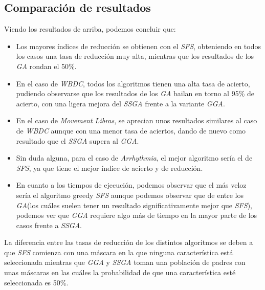 \documentclass[a4paper, 11pt]{article}
\begin{document}
		\subsection{Comparación de resultados}
			
			
			Viendo los resultados de arriba, podemos concluir que:
			\begin{itemize}
				\item Los mayores índices de reducción se obtienen con el \textit{SFS}, obteniendo en
				todos los casos una tasa de reducción muy alta, mientras que los resultados de los
				\textit{GA} rondan el 50\%.
				
				\item En el caso de \textit{WBDC}, todos los algoritmos tienen una alta tasa de acierto,
				pudiendo observarse que los resultados de los \textit{GA} bailan en torno al 95\% de
				acierto, con una ligera mejora del \textit{SSGA} frente a la variante \textit{GGA}.
				
				\item En el caso de \textit{Movement Libras}, se aprecian unos resultados similares
				al caso de \textit{WBDC} aunque con una menor tasa de aciertos, dando de nuevo como
				resultado que el \textit{SSGA} supera al \textit{GGA}.
				
				\item Sin duda alguna, para el caso de \textit{Arrhythmia}, el mejor algoritmo sería
				el de \textit{SFS}, ya que tiene el mejor índice de acierto y de reducción.
				
				\item En cuanto a los tiempos de ejecución, podemos observar que el más veloz sería el
				algoritmo greedy \textit{SFS} aunque podemos observar que de entre los \textit{GA}(los
				cuáles suelen tener un resultado significativamente mejor que \textit{SFS}), podemos
				ver que \textit{GGA} requiere algo más de tiempo en la mayor parte de los casos
				frente a \textit{SSGA}.
			\end{itemize}
			
			La diferencia entre las tasas de reducción de los distintos algoritmos se deben a que \textit{SFS}
			comienza con una máscara en la que ninguna característica está seleccionada mientras que
			\textit{GGA} y \textit{SSGA} toman una población de padres con unas máscaras en las cuáles
			la probabilidad de que una característica esté seleccionada es 50\%.
			
\end{document}
